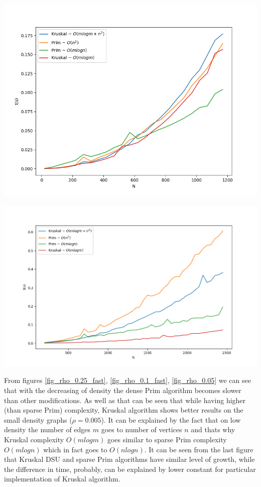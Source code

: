 \begin{center}
    \includegraphics[width=0.75\linewidth]{../results/rho_0.1_fast.png}
    \label{fig_rho_0.1_fast}
\end{center}

\begin{center}
    \includegraphics[width=0.75\linewidth]{../results/rho_0.05.png}
    \label{fig_rho_0.05}
\end{center}

From figures \ref{fig_rho_0.25_fast}, \ref{fig_rho_0.1_fast}, \ref{fig_rho_0.05} we can see that with the decreasing of density the dense Prim algorithm becomes slower than other modifications.
As well as that can be seen that while having higher (than sparse Prim) complexity, Kruskal algorithm shows better results on the small density graphs ($\rho=0.005$).
It can be explained by the fact that on low density the number of edges $m$ goes to number of vertices $n$ and thats why Kruskal complexity $O(mlogm)$  goes similar to sparse Prim complexity $O(mlogn)$ which in fact goes to $O(n log n)$.
It can be seen from the last figure that Kruskal DSU and sparse Prim algorithms have similar level of growth, while the difference in time, probably, can be explained by lower constant for particular implementation of Kruskal algorithm.

